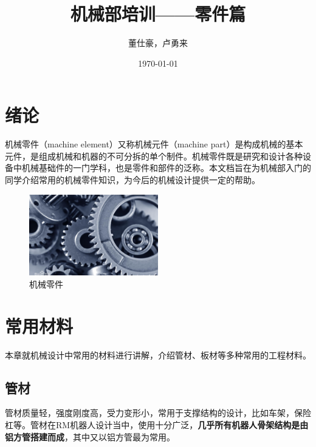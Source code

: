 \documentclass[UTF8]{article} %
\title{机械部培训——零件篇}  %
\author{董仕豪，卢勇来}   %
\date{\today}       %
\begin{document}
\maketitle          %
\newpage
\tableofcontents

\newpage

\section{绪论}
机械零件（machine element）又称机械元件（machine part）是构成机械的基本元件，是组成机械和机器的不可分拆的单个制件。机械零件既是研究和设计各种设备中机械基础件的一门学科，也是零件和部件的泛称。本文档旨在为机械部入门的同学介绍常用的机械零件知识，为今后的机械设计提供一定的帮助。

\begin{figure}[h]
  \centering
  \includegraphics[width=0.5\textwidth]{kai1.jpg}
  \caption{机械零件}
  \label{fig:kai}
\end{figure}

\section{常用材料}
本章就机械设计中常用的材料进行讲解，介绍管材、板材等多种常用的工程材料。

\subsection{管材}
管材质量轻，强度刚度高，受力变形小，常用于支撑结构的设计，比如车架，保险杠等。管材在RM机器人设计当中，使用十分广泛，\textbf{几乎所有机器人骨架结构是由铝方管搭建而成}，其中又以铝方管最为常用。
\end{document}
